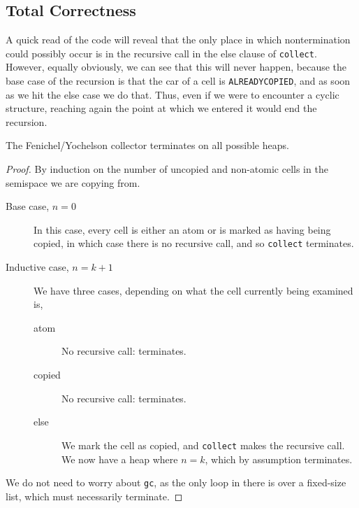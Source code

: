 \subsection{Total Correctness}
\label{sec:copying-example-total}

A quick read of the code will reveal that the only place in which
nontermination could possibly occur is in the recursive call in the
else clause of \texttt{collect}. However, equally obviously, we can
see that this will never happen, because the base case of the
recursion is that the car of a cell is \texttt{ALREADYCOPIED}, and as
soon as we hit the else case we do that. Thus, even if we were to
encounter a cyclic structure, reaching again the point at which we
entered it would end the recursion.

\begin{theorem}
  The Fenichel/Yochelson collector terminates on all possible heaps.
\end{theorem}

\begin{proof}
  By induction on the number of uncopied and non-atomic cells in the
  semispace we are copying from.

  \begin{description}
  \item[Base case, $n = 0$] In this case, every cell is either an atom
    or is marked as having being copied, in which case there is no
    recursive call, and so \texttt{collect} terminates.

  \item[Inductive case, $n = k + 1$] We have three cases, depending on
    what the cell currently being examined is,

    \begin{description}
    \item[atom] No recursive call: terminates.
    \item[copied] No recursive call: terminates.
    \item[else] We mark the cell as copied, and \texttt{collect} makes
      the recursive call. We now have a heap where $n = k$, which by
      assumption terminates.
    \end{description}
  \end{description}

  We do not need to worry about \texttt{gc}, as the only loop in there
  is over a fixed-size list, which must necessarily terminate.
\end{proof}


